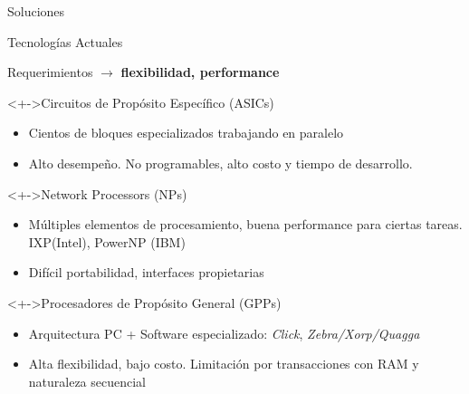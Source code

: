 \documentclass[xcolor=dvipsnames]{beamer}
\begin{document}
\begin{frame}{Soluciones}
\end{frame}  
  
   
\begin {frame}{Tecnologías Actuales}   
  
  Requerimientos $\rightarrow$ {\bf flexibilidad, performance} 
  
  \begin{block}<+->{Circuitos de Propósito Específico (ASICs)} 
    \begin{itemize}
      \scriptsize
      \item Cientos de bloques especializados trabajando en paralelo
      \item Alto desempeño. No programables, alto costo y tiempo de desarrollo.
    \end{itemize}
  \end{block}

  \begin{block}<+->{Network Processors (NPs)}   
    \begin{itemize}
      \scriptsize
      \item Múltiples elementos de procesamiento, buena performance para ciertas tareas. IXP(Intel), PowerNP (IBM)
      \item Difícil portabilidad, interfaces propietarias
    \end{itemize}
  \end{block}

  \begin{block}<+->{Procesadores de Propósito General (GPPs)} 
    \begin{itemize}
      \scriptsize
      \item Arquitectura PC + Software especializado: \emph{Click}, \emph{Zebra/Xorp/Quagga}
      \item Alta flexibilidad, bajo costo. Limitación por transacciones con RAM y naturaleza secuencial
    \end{itemize}
  \end{block}
  
\end{frame}
\end{document}
